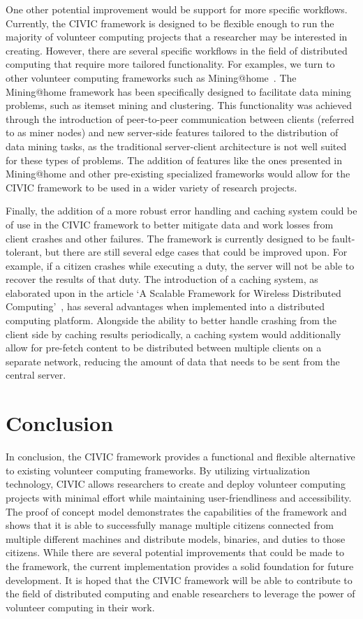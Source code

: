 \documentclass[11pt]{article}
\begin{document}
One other potential improvement would be support for more specific workflows. Currently, the CIVIC framework is designed to be flexible enough to run the majority of volunteer computing projects that a researcher may be interested in creating. However, there are several specific workflows in the field of distributed computing that require more tailored functionality. For examples, we turn to other volunteer computing frameworks such as Mining@home~\cite{Lucchese2010}. The Mining@home framework has been specifically designed to facilitate data mining problems, such as itemset mining and clustering. This functionality was achieved through the introduction of peer-to-peer communication between clients (referred to as miner nodes) and new server-side features tailored to the distribution of data mining tasks, as the traditional server-client architecture is not well suited for these types of problems. The addition of features like the ones presented in Mining@home and other pre-existing specialized frameworks would allow for the CIVIC framework to be used in a wider variety of research projects.

Finally, the addition of a more robust error handling and caching system could be of use in the CIVIC framework to better mitigate data and work losses from client crashes and other failures. The framework is currently designed to be fault-tolerant, but there are still several edge cases that could be improved upon. For example, if a citizen crashes while executing a duty, the server will not be able to recover the results of that duty. The introduction of a caching system, as elaborated upon in the article `A Scalable Framework for Wireless Distributed Computing'~\cite{Li2017}, has several advantages when implemented into a distributed computing platform. Alongside the ability to better handle crashing from the client side by caching results periodically, a caching system would additionally allow for pre-fetch content to be distributed between multiple clients on a separate network, reducing the amount of data that needs to be sent from the central server.

\section{Conclusion}

In conclusion, the CIVIC framework provides a functional and flexible alternative to existing volunteer computing frameworks. By utilizing virtualization technology, CIVIC allows researchers to create and deploy volunteer computing projects with minimal effort while maintaining user-friendliness and accessibility. The proof of concept model demonstrates the capabilities of the framework and shows that it is able to successfully manage multiple citizens connected from multiple different machines and distribute models, binaries, and duties to those citizens. While there are several potential improvements that could be made to the framework, the current implementation provides a solid foundation for future development. It is hoped that the CIVIC framework will be able to contribute to the field of distributed computing and enable researchers to leverage the power of volunteer computing in their work.


\newpage
\thispagestyle{empty}
\nocite{*} %
\renewcommand{\refname}{Bibliography} %

 
\end{document}
